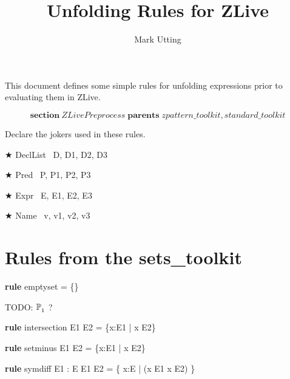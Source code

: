 \documentclass{article}
\title{Unfolding Rules for ZLive}
\author{Mark Utting}
\newenvironment{zsection}{\[}{\]}
\newcommand{\SECTION}{\textbf{section}~}
\newcommand{\parents}{\mathrel{\textbf{parents}}}
\newenvironment{zedrule}[1]{\par\textbf{rule }#1\vspace{-1ex}\infrule}{\endinfrule}
\newcommand{\derives}{\derive{}}
\newenvironment{zedjoker}[1]{\par$\bigstar$ #1\ }{}
\newcommand{\proviso}{\raisebox{0.5ex}{${}_{\blacktriangleright}\ $}}%
\begin{document}
\maketitle

This document defines some simple rules for unfolding expressions prior to
evaluating them in ZLive.

\begin{zsection}
  \SECTION ZLivePreprocess \parents zpattern\_toolkit, standard\_toolkit
\end{zsection}

Declare the jokers used in these rules.

\begin{zedjoker}{DeclList} D, D1, D2, D3 \end{zedjoker} \\
\begin{zedjoker}{Pred} P, P1, P2, P3 \end{zedjoker} \\
\begin{zedjoker}{Expr} E, E1, E2, E3 \end{zedjoker} \\
\begin{zedjoker}{Name} v, v1, v2, v3 \end{zedjoker} \\

\newcommand{\unfoldsTo}{\mathrel{\leadsto}}


\section{Rules from the sets\_toolkit}

\begin{zedrule}{emptyset}
   \emptyset = \{\}
\end{zedrule}

TODO: $\power_1$ ?

\begin{zedrule}{intersection}
   E1 \cap E2 = \{x:E1 | x \in E2\}
\end{zedrule}

\begin{zedrule}{setminus}
   E1 \setminus E2 = \{x:E1 | x \notin E2\}
\end{zedrule}

\begin{zedrule}{symdiff}
  \proviso E1 : \power E
\derives
   E1 \symdiff E2 = \{ x:E | \lnot (x \in E1 \iff x \in E2) \}
\end{zedrule}
\end{document}
